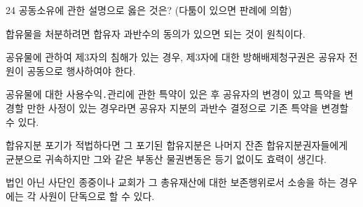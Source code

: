 \begin{question}{24}
공동소유에 관한 설명으로 옳은 것은? (다툼이 있으면 판례에 의함)
\begin{choices}
  \item 합유물을 처분하려면 합유자 과반수의 동의가 있으면 되는 것이 원칙이다.
  \item 공유물에 관하여 제3자의 침해가 있는 경우, 제3자에 대한 방해배제청구권은 공유자 전원이 공동으로 행사하여야 한다.
  \item 공유물에 대한 사용수익․관리에 관한 특약이 있은 후 공유자의 변경이 있고 특약을 변경할 만한 사정이 있는 경우라면 공유자 지분의 과반수 결정으로 기존 특약을 변경할 수 있다.
  \item 합유지분 포기가 적법하다면 그 포기된 합유지분은 나머지 잔존 합유지분권자들에게 균분으로 귀속하지만 그와 같은 부동산 물권변동은 등기 없이도 효력이 생긴다.
  \item 법인 아닌 사단인 종중이나 교회가 그 총유재산에 대한 보존행위로서 소송을 하는 경우에는 각 사원이 단독으로 할 수 있다.
\end{choices}
\end{question}
